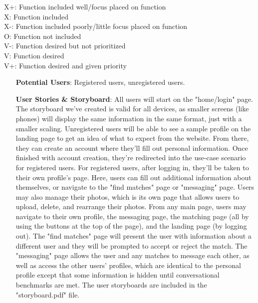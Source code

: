 \documentclass{article}
\begin{document}
    X+: Function included well/focus placed on function\\
    X: Function included\\
    X-: Function included poorly/little focus placed on function\\
    O: Function not included\\
    V-: Function desired but not prioritized\\
    V: Function desired\\
    V+: Function desired and given priority\\
    
    \begin{enumerate}
        \item[\textbf{Potential Users}:]
        Registered users, unregistered users.\\
        
        \item[\textbf{User Stories & Storyboard}:]
        All users will start on the "home/login" page. The storyboard we've created is valid for all devices, as smaller screens (like phones) will display the same information in the same format, just with a smaller scaling. Unregistered users will be able to see a sample profile on the landing page to get an idea of what to expect from the website. From there, they can create an account where they'll fill out personal information. Once finished with account creation, they're redirected into the use-case scenario for registered users. For registered users, after logging in, they'll be taken to their own profile's page. Here, users can fill out additional information about themselves, or navigate to the "find matches" page or "messaging" page. Users may also manage their photos, which is its own page that allows users to upload, delete, and rearrange their photos. From any main page, users may navigate to their own profile, the messaging page, the matching page (all by using the buttons at the top of the page), and the landing page (by logging out). The "find matches" page will present the user with information about a different user and they will be prompted to accept or reject the match. The "messaging" page allows the user and any matches to message each other, as well as access the other users' profiles, which are identical to the personal profile except that some information is hidden until conversational benchmarks are met. The user storyboards are included in the "storyboard.pdf" file.
    \end{enumerate}
    
\end{document}
